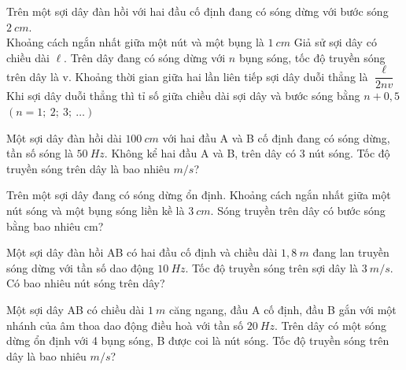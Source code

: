 \begin{ex}
Trên một sợi dây đàn hồi với hai đầu cố định đang có sóng dừng với bước sóng $2 \ cm$.\\
{Khoảng cách ngắn nhất giữa một nút và một bụng là $1 \ cm$}
{Giả sử sợi dây có chiều dài $\ell$. Trên dây đang có sóng dừng với $n$ bụng sóng, tốc độ truyền sóng trên dây là v. Khoảng thời gian giữa hai lần liên tiếp sợi dây duỗi thẳng là $\dfrac{\ell}{2 nv}$}
{Khi sợi dây duỗi thẳng thì tỉ số giữa chiều dài sợi dây và bước sóng bằng $n+0,5$ $(n=1;\ 2;\ 3;\ \ldots)$}
\end{ex} 
\setcounter{paragraph}{0}
\setcounter{ex}{0}
\PhanIII
\begin{ex}
Một sợi dây đàn hồi dài $100 \ cm$ với hai đầu A và B cố định đang có sóng dừng, tần số sóng là $50 \ Hz$. Không kể hai đầu A và B, trên dây có 3 nút sóng. Tốc độ truyền sóng trên dây là bao nhiêu $m/s$?
\end{ex} 
\begin{ex}
Trên một sợi dây đang có sóng dừng ổn định. Khoảng cách ngắn nhất giữa một nút sóng và một bụng sóng liền kề là $3 \ cm$. Sóng truyền trên dây có bước sóng bằng bao nhiêu cm?
\end{ex} 
\begin{ex}
Một sợi dây đàn hồi AB có hai đầu cố định và chiều dài $1,8 \ m$ đang lan truyền sóng dừng với tần số dao động $10 \ Hz$. Tốc độ truyền sóng trên sợi dây là $3 \ m/s$. Có bao nhiêu nút sóng trên dây?
\end{ex} 
\begin{ex}
Một sợi dây AB có chiều dài $1 \ m$ căng ngang, đầu A cố định, đầu B gắn với một nhánh của âm thoa dao động điều hoà với tần số $20 \ Hz$. Trên dây có một sóng dừng ổn định với 4 bụng sóng, B được coi là nút sóng. Tốc độ truyền sóng trên dây là bao nhiêu $m/s$?
\end{ex} 
